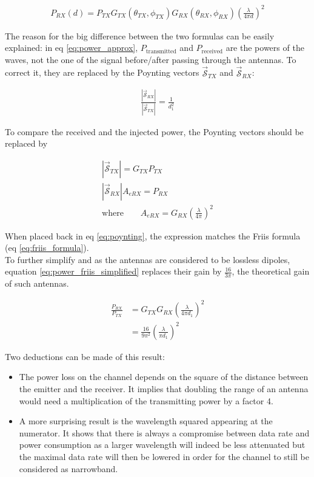 \documentclass[10pt,a4paper]{ULBreport}
\begin{document}
\begin{align}
    P_{RX}(d) = P_{TX} G_{TX}(\theta_{TX}, \phi_{TX})G_{RX}(\theta_{RX}, \phi_{RX})\left(\frac{\lambda}{4\pi d}\right)^2
    \label{eq:friis_formula}
\end{align}

The reason for the big difference between the two formulas can be easily explained: in eq \ref{eq:power_approx}, $P_{\text{transmitted}}$ and $P_{\text{received}}$ are the powers of the waves, not the one of the signal before/after passing through the antennas. To correct it, they are replaced by the Poynting vectors $\bm{\vec{\mathscr{S}}}_{TX}$ and $\bm{\vec{\mathscr{S}}}_{RX}$:

\begin{align}
    \frac{\left|\bm{\vec{\mathscr{S}}}_{RX}\right|}{\left|\bm{\vec{\mathscr{S}}}_{TX}\right|} = \frac{1}{d_1^2}
    \label{eq:poynting}
\end{align}

To compare the received and the injected power, the Poynting vectors should be replaced by

\begin{align*}
    \left|\bm{\vec{\mathscr{S}}}_{TX}\right| = G_{TX} P_{TX}\\
    \left|\bm{\vec{\mathscr{S}}}_{RX}\right| A_{eRX} = P_{RX}\\
    \text{where} \quad \quad A_{eRX} = G_{RX}\left(\frac{\lambda}{4\pi}\right)^2
\end{align*}

When placed back in eq \ref{eq:poynting}, the expression matches the Friis formula (eq \ref{eq:friis_formula}). \\
To further simplify and as the antennas are considered to be lossless dipoles, equation \ref{eq:power_friis_simplified} replaces their gain by $\frac{16}{3\pi}$, the theoretical gain of such antennas.

\begin{align}
    \frac{P_{RX}}{P_{TX}} &= G_{TX} G_{RX} \left(\frac{\lambda}{4\pi d_1}\right)^2\\
    \label{eq:power_friis_simplified}
    &= \frac{16}{9\pi^2} \left(\frac{\lambda}{\pi d_1}\right)^2
\end{align}

Two deductions can be made of this result: 
\begin{itemize}
    \item The power loss on the channel depends on the square of the distance between the emitter and the receiver. It implies that doubling the range of an antenna would need a multiplication of the transmitting power by a factor 4.
    \item A more surprising result is the wavelength squared appearing at the numerator. It shows that there is always a compromise between data rate and power consumption as a larger wavelength will indeed be less attenuated but the maximal data rate will then be lowered in order for the channel to still be considered as narrowband.
\end{itemize}
\end{document}
